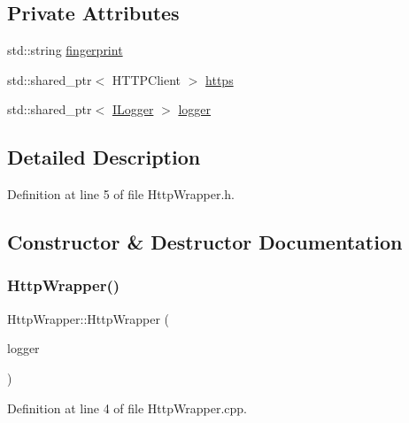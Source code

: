 \subsection*{Private Attributes}
\begin{DoxyCompactItemize}
\item 
std\+::string \hyperlink{class_http_wrapper_ad79bd50b7d1e7de1de0677eecbf2a8d3}{fingerprint}
\item 
std\+::shared\+\_\+ptr$<$ H\+T\+T\+P\+Client $>$ \hyperlink{class_http_wrapper_a166384df03a99c77da6051fcf6f25f29}{https}
\item 
std\+::shared\+\_\+ptr$<$ \hyperlink{class_i_logger}{I\+Logger} $>$ \hyperlink{class_http_wrapper_aecd53efb752913b0a9beb14491ce8baa}{logger}
\end{DoxyCompactItemize}


\subsection{Detailed Description}


Definition at line 5 of file Http\+Wrapper.\+h.



\subsection{Constructor \& Destructor Documentation}
\mbox{\label{class_http_wrapper_ad2dd768eee3169e710f1398472cbdbfa}} 
\subsubsection{\texorpdfstring{Http\+Wrapper()}{HttpWrapper()}}
{\footnotesize\ttfamily Http\+Wrapper\+::\+Http\+Wrapper (\begin{DoxyParamCaption}\item[{std\+::shared\+\_\+ptr$<$ \hyperlink{class_i_logger}{I\+Logger} $>$}]{logger }\end{DoxyParamCaption})}



Definition at line 4 of file Http\+Wrapper.\+cpp.

\mbox{\label{class_http_wrapper_a5943777943275825f7c40e246203f59a}} 
